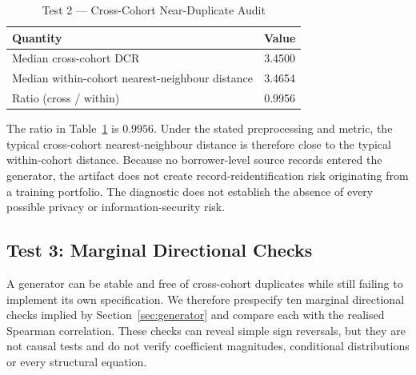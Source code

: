 \documentclass[journal]{IEEEtran}
\begin{document}
\begin{table}[!t]
\caption{Test 2 --- Cross-Cohort Near-Duplicate Audit}
\label{tab:privacy}
\centering
\footnotesize
\begin{tabular}{@{}lc@{}}
\toprule
Quantity & Value \\
\midrule
Median cross-cohort DCR & 3.4500 \\
Median within-cohort nearest-neighbour distance & 3.4654 \\
Ratio (cross / within) & 0.9956 \\
\bottomrule
\end{tabular}
\end{table}

The ratio in Table~\ref{tab:privacy} is $0.9956$. Under the stated preprocessing and metric, the typical cross-cohort nearest-neighbour distance is therefore close to the typical within-cohort distance. Because no borrower-level source records entered the generator, the artifact does not create record-reidentification risk originating from a training portfolio. The diagnostic does not establish the absence of every possible privacy or information-security risk.

\subsection{Test 3: Marginal Directional Checks}
A generator can be stable and free of cross-cohort duplicates while still failing to implement its own specification. We therefore prespecify ten marginal directional checks implied by Section~\ref{sec:generator} and compare each with the realised Spearman correlation. These checks can reveal simple sign reversals, but they are not causal tests and do not verify coefficient magnitudes, conditional distributions or every structural equation.
\end{document}
